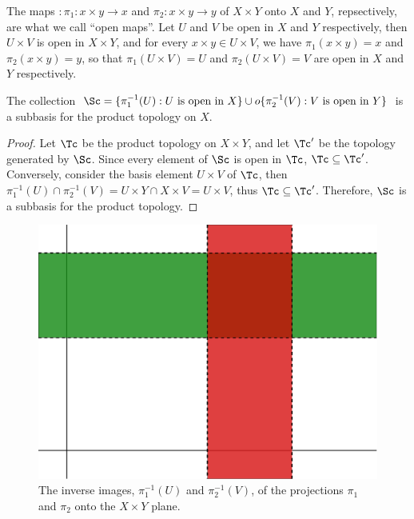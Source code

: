 \begin{example}\label{1.7}
    The maps $:\pi_1:x \times y \rightarrow x$ and $\pi_2:x \times y \rightarrow
    y$ of $X \times Y$ onto  $X$ and  $Y$, repsectively, are what we call ``open
    maps''. Let $U$ and  $V$ be open in  $X$ and  $Y$ respectively, then  $U
    \times V$ is open in  $X \times Y$, and for every  $x \times y \in U \times
    V$, we have  $\pi_1(x \times y)=x$ and $\pi_2(x \times y)=y$, so that
    $\pi_1(U \times V)=U$ and $\pi_2(U \times V)=V$ are open in $X$ and  $Y$
    respectively.
\end{example}

\begin{theorem}\label{1.4.3}
    The collection $\Sc=\{\pi_1^{-1}(U): U \text{ is open in } X\} \cup o
    \{\pi_2^{-1}(V): V \text{ is open in } Y\}$ is a subbasis for the product
    topology on $X$.
\end{theorem}
\begin{proof}
    Let $\Tc$ be the product topology on  $X \times Y$, and let  $\Tc'$ be the topology
    generated by $\Sc$. Since every element of  $\Sc$ is open in  $\Tc$,  $\Tc \subseteq \Tc'$. Conversely,
    consider the basis element  $U \times V$ of $\Tc$, then  $\pi_1^{-1}(U) \cap \pi_2^{-1}(V)=
    U \times Y \cap X \times V=U \times V$, thus $\Tc \subseteq \Tc'$. Therefore, $\Sc$ is a subbasis for the
    product topology.
\end{proof}

\begin{figure}[h]
    \centering
    \includegraphics[scale = 0.5]{Figures/chapter1/inverse_projections.eps}
    \caption{The inverse images, $\pi_1^{-1}(U)$ and $\pi_2^{-1}(V)$, of the
    projections $\pi_1$ and $\pi_2$ onto the $X \times Y$ plane.}
    \label{fig1.5}
\end{figure}
